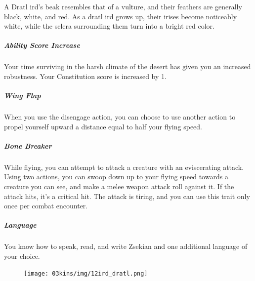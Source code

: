 A Dratl ird's beak resembles that of a vulture, and their feathers are generally black, white, and red.
As a dratl ird grows up, their irises become noticeably white, while the sclera surrounding them turn into a bright red color.

\subparagraph{Ability Score Increase} Your time surviving in the harsh climate of the desert has given you an increased robustness.
Your Constitution score is increased by 1.

\subparagraph{Wing Flap} When you use the disengage action, you can choose to use another action to propel yourself upward a distance equal to half your flying speed.

\subparagraph{Bone Breaker} While flying, you can attempt to attack a creature with an eviscerating attack.
Using two actions, you can swoop down up to your flying speed towards a creature you can see, and make a melee weapon attack roll against it.
If the attack hits, it's a critical hit.
The attack is tiring, and you can use this trait only once per combat encounter.

\subparagraph{Language} You know how to speak, read, and write Zsekian and one additional language of your choice.

\begin{figure}[!b]
    \centering
    \texttt{[image: 03kins/img/12ird\_dratl.png]}
\end{figure}


\newpage
